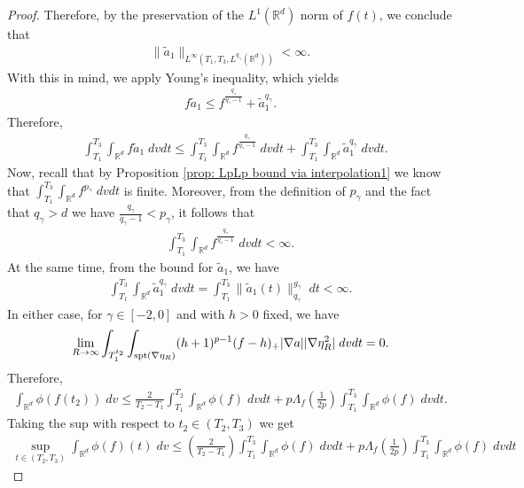 \documentclass[12pt,american]{amsart}
\numberwithin{equation}{section}
\theoremstyle{plain}
\theoremstyle{definition}                  %
\begin{document}
\begin{proof}
  Therefore, by the preservation of the $L^1(\mathbb{R}^d)$ norm of $f(t)$, we conclude that
  \begin{align*}
    \| \tilde a_1 \|_{L^\infty(T_1,T_3,L^{q_\gamma}(\mathbb{R}^d) )} <\infty. 
  \end{align*}
  With this in mind, we apply Young's inequality, which yields 
  \begin{align*}
    f\tilde a_1 \leq f^{\frac{q_\gamma}{q_\gamma-1}} + \tilde a_1^{q_\gamma}.
  \end{align*}
  Therefore, 
  \begin{align*}
    & \int_{T_1}^{T_3} \int_{\mathbb{R}^d} f \tilde a_1 \;dvdt \leq  \int_{T_1}^{T_3} \int_{\mathbb{R}^d} f^{\frac{q_\gamma}{q_\gamma-1}} \;dvdt + \int_{T_1}^{T_3} \int_{\mathbb{R}^d} \tilde a_1^{q_\gamma }\;dvdt.
  \end{align*}
  Now, recall that by Proposition \ref{prop: LpLp bound via interpolation1} we know that $\int_{T_1}^{T_3}\int_{\mathbb{R}^d} f^{p_\gamma}\;dvdt$ is finite. Moreover, from the definition of $p_\gamma$ and the fact that $q_\gamma>d$ we have  $\frac{q_\gamma}{q_\gamma-1}<p_\gamma$, it follows that
  \begin{align*}
    \int_{T_1}^{T_3} \int_{\mathbb{R}^d} f^{\frac{q_\gamma}{q_\gamma-1}} \;dvdt  <\infty.
  \end{align*}
  At the same time, from the bound for $\tilde a_1$, we have
  \begin{align*}
    \int_{T_1}^{T_3}\int_{\mathbb{R}^d}\tilde a_1^{q_\gamma} \;dvdt  = \int_{T_1}^{T_3} \|\tilde a_1(t)\|_{q_\gamma}^{g_\gamma}\;dt <\infty.
  \end{align*}
  In either case, for $\gamma \in [-2,0]$ and with $h>0$ fixed, we have
  \begin{align*}
    \lim\limits_{R\to\infty} \int_{T_1^{t_2}}\int_{\textnormal{spt}(\nabla \eta_R)}(h+1)^{p-1}(f-h)_+|\nabla a||\nabla \eta_R^2|\;dvdt = 0.
  \end{align*}
  Therefore,
  \begin{align*}
      \int_{\mathbb{R}^d}\phi(f(t_2))\;dv \leq \frac{2}{T_2-T_1}\int_{T_1}^{T_2}\int_{\mathbb{R}^d} \phi(f)\;dvdt+p\Lambda_f(\tfrac{1}{2p})\int_{T_1}^{T_3}\int_{\mathbb{R}^d}\phi(f)\;dvdt.
  \end{align*}  
  Taking the sup with respect to $t_2 \in (T_2,T_3)$ we get 
   \begin{align*}
    \sup_{t\in(T_2,T_3)}  \int_{\mathbb{R}^d}\phi(f)(t)\;dv  \leq \left( \frac{2}{T_2-T_1} \right)\int_{T_1}^{T_3}\int_{\mathbb{R}^d}\phi(f)\;dvdt+p\Lambda_f(\tfrac{1}{2p})\int_{T_1}^{T_3}\int_{\mathbb{R}^d} \phi(f)\;dvdt

\end{align*}
\end{proof}
\end{document}

